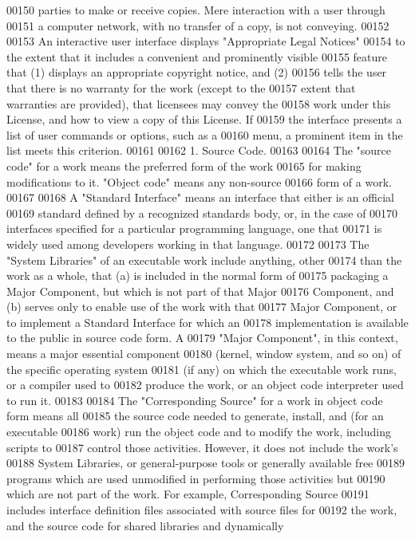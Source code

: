 \begin{DoxyCode}
00150 parties to make or receive copies.  Mere interaction with a user through
00151 a computer network, with no transfer of a copy, is not conveying.
00152 
00153   An interactive user interface displays "Appropriate Legal Notices"
00154 to the extent that it includes a convenient and prominently visible
00155 feature that (1) displays an appropriate copyright notice, and (2)
00156 tells the user that there is no warranty for the work (except to the
00157 extent that warranties are provided), that licensees may convey the
00158 work under this License, and how to view a copy of this License.  If
00159 the interface presents a list of user commands or options, such as a
00160 menu, a prominent item in the list meets this criterion.
00161 
00162   1. Source Code.
00163 
00164   The "source code" for a work means the preferred form of the work
00165 for making modifications to it.  "Object code" means any non-source
00166 form of a work.
00167 
00168   A "Standard Interface" means an interface that either is an official
00169 standard defined by a recognized standards body, or, in the case of
00170 interfaces specified for a particular programming language, one that
00171 is widely used among developers working in that language.
00172 
00173   The "System Libraries" of an executable work include anything, other
00174 than the work as a whole, that (a) is included in the normal form of
00175 packaging a Major Component, but which is not part of that Major
00176 Component, and (b) serves only to enable use of the work with that
00177 Major Component, or to implement a Standard Interface for which an
00178 implementation is available to the public in source code form.  A
00179 "Major Component", in this context, means a major essential component
00180 (kernel, window system, and so on) of the specific operating system
00181 (if any) on which the executable work runs, or a compiler used to
00182 produce the work, or an object code interpreter used to run it.
00183 
00184   The "Corresponding Source" for a work in object code form means all
00185 the source code needed to generate, install, and (for an executable
00186 work) run the object code and to modify the work, including scripts to
00187 control those activities.  However, it does not include the work's
00188 System Libraries, or general-purpose tools or generally available free
00189 programs which are used unmodified in performing those activities but
00190 which are not part of the work.  For example, Corresponding Source
00191 includes interface definition files associated with source files for
00192 the work, and the source code for shared libraries and dynamically

\end{DoxyCode}

